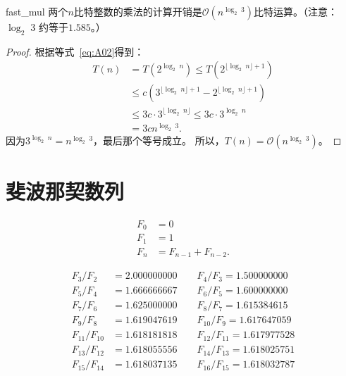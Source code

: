 \begin{theorem}{}{fast_mul}
	两个$n$比特整数的乘法的计算开销是$\mathcal{O}(n^{\log_2\; 3})$比特运算。（注意：$\log_2 \; 3$ 约等于$1.585$。）
\end{theorem}

\begin{proof}
根据等式~\ref{eq:A02}得到：
	\begin{align*}
	T(n) &= T(2^{\log_2\; n}) \leq T(2^{\lfloor \log_2 \; n\rfloor + 1})\\
	         &\leq c(3^{\lfloor \log_2 \; n \rfloor+ 1} - 2^{\lfloor \log_2 \; n \rfloor+ 1})\\
	         &\leq3c\cdot 3^{\lfloor \log_2 \; n \rfloor} \leq 3c\cdot 3^{\log_2 \; n }\\
	         &= 3cn^{\log_2\; 3} .
	\end{align*}
	因为$3^{\log_2 \; n} = n^{\log_2 \; 3}$，最后那个等号成立。
	所以，$T(n)=\mathcal{O}(n^{\log_2\; 3})$。
\end{proof}

\chapter{斐波那契数列}
\label{chap:fib}

\begin{align*}
F_0 &= 0\\
F_1 &= 1 \\
F_n &= F_{n-1} + F_{n-2}.
\end{align*}

\begin{center}
	
\end{center}

\begin{center}
	
\end{center}

\begin{align*}
	F_3 / F_2 &= 2.000000000  \qquad F_4 / F_3 = 1.500000000\\
    F_5 / F_4 &= 1.666666667  \qquad F_6 / F_5 = 1.600000000\\
    F_7 / F_6 &= 1.625000000  \qquad F_8 / F_7 = 1.615384615\\
    F_9 / F_8 &= 1.619047619  \qquad F_{10} / F_9 = 1.617647059\\
    F_{11} / F_{10} &= 1.618181818  \qquad  F_{12} / F_{11} = 1.617977528\\
    F_{13} / F_{12} &= 1.618055556  \qquad F_{14} / F_{13} = 1.618025751\\
    F_{15} / F_{14} &= 1.618037135   \qquad F_{16} / F_{15} = 1.618032787
\end{align*}

